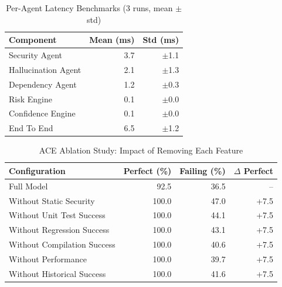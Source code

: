 \begin{table}[htbp]
\centering
\caption{Per-Agent Latency Benchmarks (3 runs, mean $\pm$ std)}
\label{tab:latency}
\begin{tabular}{lrr}
\toprule
Component & Mean (ms) & Std (ms) \\
\midrule
Security Agent & 3.7 & $\pm$1.1 \\
Hallucination Agent & 2.1 & $\pm$1.3 \\
Dependency Agent & 1.2 & $\pm$0.3 \\
Risk Engine & 0.1 & $\pm$0.0 \\
Confidence Engine & 0.1 & $\pm$0.0 \\
End To End & 6.5 & $\pm$1.2 \\
\bottomrule
\end{tabular}
\end{table}

\begin{table}[htbp]
\centering
\caption{ACE Ablation Study: Impact of Removing Each Feature}
\label{tab:ablation}
\begin{tabular}{lrrr}
\toprule
Configuration & Perfect (\%) & Failing (\%) & $\Delta$ Perfect \\
\midrule
Full Model & 92.5 & 36.5 & -- \\
\midrule
Without Static Security & 100.0 & 47.0 & +7.5 \\
Without Unit Test Success & 100.0 & 44.1 & +7.5 \\
Without Regression Success & 100.0 & 43.1 & +7.5 \\
Without Compilation Success & 100.0 & 40.6 & +7.5 \\
Without Performance & 100.0 & 39.7 & +7.5 \\
Without Historical Success & 100.0 & 41.6 & +7.5 \\
\bottomrule
\end{tabular}
\end{table}